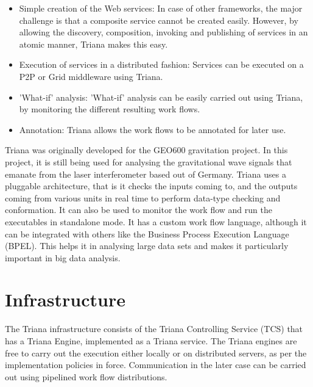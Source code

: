\documentclass[9pt,twocolumn,twoside]{styles/osajnl}
\begin{document}
\begin{itemize} 

\item Simple creation of the Web services: In case of other frameworks, 
the major challenge is that a composite service cannot be created 
easily. However, by allowing the discovery, composition, invoking and 
publishing of services in an atomic manner, Triana makes this easy. 

\item Execution of services in a distributed fashion: Services can be 
executed on a P2P or Grid middleware using Triana. 

\item 'What-if' analysis: 'What-if' analysis can be easily carried out 
using Triana, by monitoring the different resulting work flows. 

\item Annotation: Triana allows the work flows to be annotated for later 
use. 

\end{itemize}

\cite{TrianaGEO600} Triana was originally developed for the GEO600
gravitation project.  In this project, it is still being used for
analysing the gravitational wave signals that emanate from the laser
interferometer based out of Germany.  \cite{TrianaDocumentation2}
Triana uses a pluggable architecture, that is it checks the inputs
coming to, and the outputs coming from various units in real time to
perform data-type checking and conformation.  It can also be used to
monitor the work flow and run the executables in standalone mode.
\cite{RMBDP-Book} It has a custom work flow language, although it can
be integrated with others like the Business Process Execution Language
(BPEL).  This helps it in analysing large data sets and makes it
particularly important in big data analysis.

\section{Infrastructure}

\cite{TrianaDocumentation2} The Triana infrastructure consists of the
Triana Controlling Service (TCS) that has a Triana Engine, implemented
as a Triana service.  The Triana engines are free to carry out the
execution either locally or on distributed servers, as per the
implementation policies in force.  Communication in the later case can
be carried out using pipelined work flow distributions.
\end{document}
